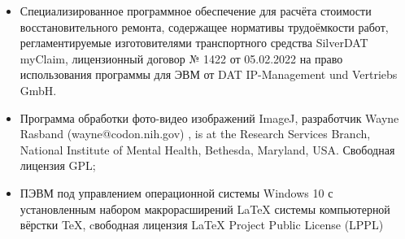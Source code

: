 \begin{itemize}
\item  Специализированное программное обеспечение для расчёта стоимости  восстановительного ремонта, содержащее нормативы трудоёмкости работ, регламентируемые изготовителями транспортного средства  SilverDAT myClaim,
лицензионный договор № 1422 от 05.02.2022 на право использования программы для ЭВМ от  DAT IP-Management und Vertriebs GmbH.

%	
	\item  Программа обработки фото-видео изображений ImageJ, разработчик  Wayne Rasband (wayne@codon.nih.gov) , is at the Research Services Branch, National Institute of Mental Health, Bethesda, Maryland, USA. Свободная лицензия GPL;
	\item  ПЭВМ под управлением операционной системы Windows 10 с установленным набором макрорасширений LaTeX системы компьютерной вёрстки TeX, cвободная лицензия LaTeX Project Public License (LPPL)
\end{itemize}